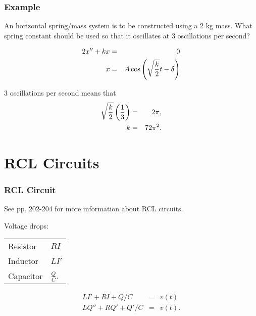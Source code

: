 \begin{frame}
  \frametitle{Example}

  An horizontal spring/mass system is to be constructed using a 2 kg
  mass. What spring constant should be used so that it oscillates at 3
  oscillations per second?

  \begin{eqnarray*}
    2 x'' + kx & = & 0 \\
    x & = & A \cos\left( \sqrt{\frac{k}{2}} t - \delta \right) \\
  \end{eqnarray*}

  {
    3 oscillations per second means that
    \begin{eqnarray*}
      \sqrt{\frac{k}{2}} \left( \frac{1}{3} \right) & = & 2 \pi, \\
      k & = & 72 \pi^2.
    \end{eqnarray*}
  }

\end{frame}

\section{RCL Circuits}

\begin{frame}
  \frametitle{RCL Circuit}

  See pp. 202-204 for more information about RCL circuits.

  Voltage drops: \\
  \begin{tabular}{l@{~$=$~}l}
    Resistor & $RI$ \\
    Inductor & $LI'$ \\
    Capacitor & $\frac{Q}{C}$.
  \end{tabular}

  \begin{eqnarray*}
    L I' + RI + Q/C & = & v(t) \\
    L Q'' + RQ' + Q'/C & = & v(t).
  \end{eqnarray*}

\end{frame}



